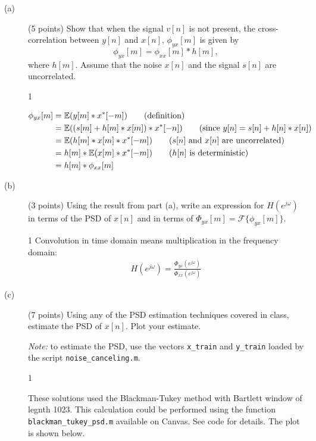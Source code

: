 \documentclass[10pt]{article}
\def\SOLUTIONS{1} %
\def\SolutionsColor{red2}
\begin{document}
\begin{description}
	\item [(a)] (5 points) Show that when the signal $v[n]$ is not present, the cross-correlation between $y[n]$ and $x[n]$, $\phi_{yx}[m]$ is given by
	\begin{equation}
		\phi_{yx}[m] = \phi_{xx}[m]\ast h[m],
	\end{equation}
	where $h[m]$. Assume that the noise $x[n]$ and the signal $s[n]$ are uncorrelated. 
	
	\if\SOLUTIONS1 {\color{\SolutionsColor}
		
		\begin{align*}
		\phi_{yx}[m] &= \operatorname{\mathbb{E}}(y[m]\ast x^*[-m]) \tag{definition} \\
		&= \operatorname{\mathbb{E}}((s[m] + h[m]\ast x[m])\ast x^*[-n]) \tag{since $y[n] = s[n] + h[n]*x[n]$} \\
		&= \operatorname{\mathbb{E}}(h[m]\ast x[m]\ast x^*[-m]) \tag{$s[n]$ and $x[n]$ are uncorrelated} \\
		&= h[m]\ast \operatorname{\mathbb{E}}(x[m]\ast x^*[-m]) \tag{$h[n]$ is deterministic} \\
		&= h[m]\ast \phi_{xx}[m]
		\end{align*}
	}\fi
	
	\item [(b)] (3 points) Using the result from part (a), write an expression for $H(e^{j\omega})$ in terms of the PSD of $x[n]$ and in terms of $\Phi_{yx}[m] = \mathcal{F}\{\phi_{yx}[m]\}$.
	
	\if\SOLUTIONS1 {\color{\SolutionsColor} Convolution in time domain means multiplication in the frequency domain:
		\begin{align*}
		H(e^{j\omega}) = \frac{\Phi_{yx}(e^{j\omega})}{\Phi_{xx}(e^{j\omega})}
		\end{align*}
	}\fi
		
	\item[(c)] (7 points) Using any of the PSD estimation techniques covered in class, estimate the PSD of $x[n]$. Plot your estimate.
	
	\textit{Note:} to estimate the PSD, use the vectors \texttt{x\_train} and \texttt{y\_train} loaded by the script \texttt{noise\_canceling.m}.
	
	\if\SOLUTIONS1 {\color{\SolutionsColor} These solutions used the Blackman-Tukey method with Bartlett window of legnth 1023. This calculation could be performed using the function \texttt{blackman\_tukey\_psd.m} available on Canvas. See code for details. The plot is shown below.
		
}
\end{description}
\end{document}
